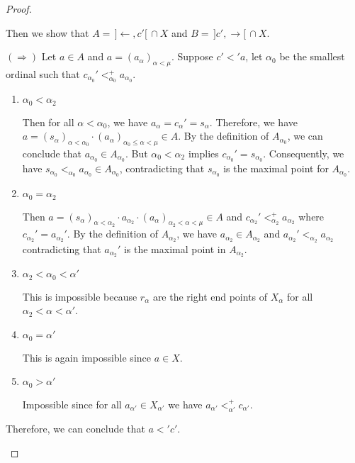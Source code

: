 \documentclass[12pt,oneside,english]{amsbook}
\numberwithin{equation}{section} %
\numberwithin{figure}{section} %
\theoremstyle{plain}
\numberwithin{section}{chapter}
\theoremstyle{plain}
\begin{document}
\begin{proof}
\begin{enumerate}
      Then we show that $A  = \, ] \leftarrow , c' [ \, \cap X$ and $B  = \, ] c' , \rightarrow [ \, \cap X$.

      $(\Rightarrow)$  Let $a  \in  A$ and $a  =  (a_{\alpha})_{\alpha < \mu}$. Suppose $c' <' a$, let $\alpha_{0}$ be the smallest ordinal such that $c_{\alpha_{0}}' <_{\alpha_{0}}^+ a_{\alpha_{0}}$.
      \begin{enumerate}
      \item $\alpha_{0} < \alpha_{2}$
        
        Then for all $\alpha < \alpha_{0}$, we have $a_{\alpha}  =  c_{\alpha}'  =  s_{\alpha}$. Therefore, we have $a  =  (s_{\alpha})_{\alpha < \alpha_{0}} \cdot (a_{\alpha})_{\alpha_{0} \leq \alpha < \mu}  \in  A$. By the definition of $A_{\alpha_{0}}$, we can conclude that $a_{\alpha_{0}}  \in  A_{\alpha_{0}}$. But $\alpha_{0} < \alpha_{2}$ implies $c_{\alpha_{0}}'  =  s_{\alpha_{0}}$. Consequently, we have $s_{\alpha_{0}} <_{\alpha_0} a_{\alpha_{0}}  \in  A_{\alpha_{0}}$, contradicting that $s_{\alpha_{0}}$ is the maximal point for $A_{\alpha_{0}}$.
        
      \item $\alpha_{0}  =  \alpha_{2}$
        
        Then $a  =  (s_{\alpha})_{\alpha < \alpha_{2}} \cdot a_{\alpha_{2}} \cdot (a_{\alpha})_{\alpha_{2} < \alpha < \mu} \in  A$ and $c_{\alpha_{2}}' <_{\alpha_{2}}^+ a_{\alpha_{2}}$ where $c_{\alpha_{2}}'  =  a_{\alpha_{2}}'$. By the definition of $A_{\alpha_{2}}$, we have $a_{\alpha_{2}}  \in  A_{\alpha_{2}}$ and $a_{\alpha_{2}}' <_{\alpha_2} a_{\alpha_{2}}$ contradicting that $a_{\alpha_{2}}'$ is the maximal point in $A_{\alpha_{2}}$.
      \item $\alpha_{2} < \alpha_{0} < \alpha'$
        
        This is impossible because $r_{\alpha}$ are the right end points of $X_{\alpha}$ for all $\alpha_{2} < \alpha < \alpha'$.
      \item $\alpha_{0}  =  \alpha'$
        
        This is again impossible since $a  \in  X$.
      \item $\alpha_{0} > \alpha'$
        
        Impossible since for all $a_{\alpha'}  \in  X_{\alpha'}$ we have $a_{\alpha'} <_{\alpha'}^+ c_{\alpha'}$.
      \end{enumerate}

      Therefore, we can conclude that $a <' c'$.


\end{enumerate}
\end{proof}
\end{document}
